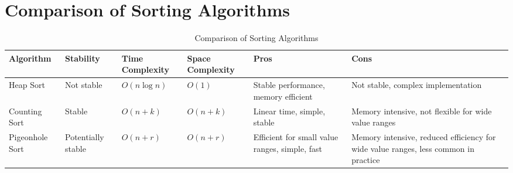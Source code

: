\section{Comparison of Sorting Algorithms}

\begin{table}[H]
    \centering
    \renewcommand{\arraystretch}{1.2} %
    \setlength{\tabcolsep}{4pt} %
    \footnotesize %
    \begin{tabularx}{\textwidth}{|X|X|X|X|X|X|}
        \hline
        \textbf{Algorithm} & \textbf{Stability} & \textbf{Time Complexity} & \textbf{Space Complexity} & \textbf{Pros} & \textbf{Cons} \\ \hline
        Heap Sort          & Not stable         & $O(n \log n)$            & $O(1)$                    & Stable performance, memory efficient & Not stable, complex implementation \\ \hline
        Counting Sort      & Stable             & $O(n + k)$               & $O(n + k)$                & Linear time, simple, stable           & Memory intensive, not flexible for wide value ranges \\ \hline
        Pigeonhole Sort    & Potentially stable & $O(n + r)$               & $O(n + r)$                & Efficient for small value ranges, simple, fast & Memory intensive, reduced efficiency for wide value ranges, less common in practice \\ \hline
    \end{tabularx}
    \caption{Comparison of Sorting Algorithms}
    \label{tab:sorting_algorithms}
\end{table}
